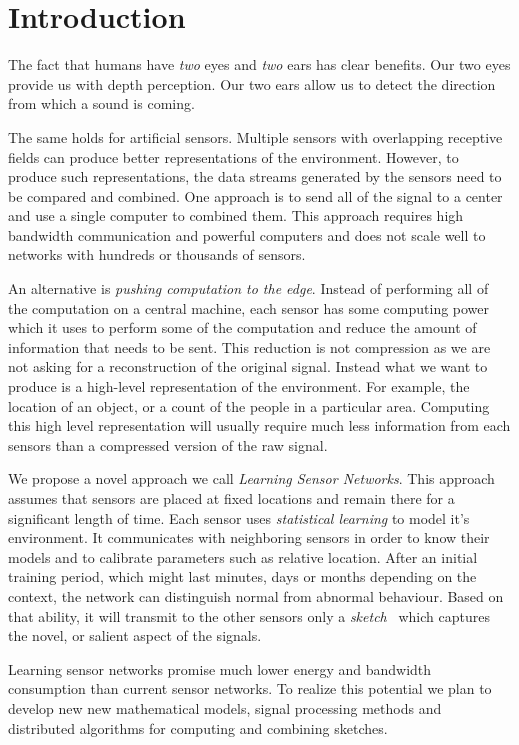 \section{Introduction}
The fact that humans have {\em two} eyes and {\em two} ears has clear
benefits. Our two eyes provide us with depth perception. Our two ears
allow us to detect the direction from which a sound is coming.

The same holds for artificial sensors. Multiple sensors with
overlapping receptive fields can produce better representations of the
environment. However, to produce such representations, the data
streams generated by the sensors need to be compared and combined. One
approach is to send all of the signal to a center and use a single
computer to combined them. This approach requires high bandwidth
communication and powerful computers and does not scale well to
networks with hundreds or thousands of sensors.

An alternative is {\em pushing computation to the edge}. Instead of
performing all of the computation on a central machine, each sensor
has some computing power which it uses to perform some of the
computation and reduce the amount of information that needs to be
sent. This reduction is not compression as we are not asking for a
reconstruction of the original signal. Instead what we want to produce
is a high-level representation of the environment. For example, the
location of an object, or a count of the people in a particular
area. Computing this high level representation will usually require
much less information from each sensors than a compressed version of
the raw signal.

We propose a novel approach we call {\em Learning Sensor Networks}.
This approach assumes that sensors are placed at fixed locations and
remain there for a significant length of time.  Each sensor uses {\em
  statistical learning} to model it's environment. It communicates
with neighboring sensors in order to know their models and to
calibrate parameters such as relative location. After an initial
training period, which might last minutes, days or months depending on
the context, the network can distinguish normal from abnormal
behaviour. Based on that ability, it will transmit to the other
sensors only a {\em sketch}~\cite{} which captures the novel, or
salient aspect of the signals.

Learning sensor networks promise much lower energy and bandwidth
consumption than current sensor networks. To realize this potential we
plan to develop new new mathematical models, signal processing methods
and distributed algorithms for computing and combining sketches.


